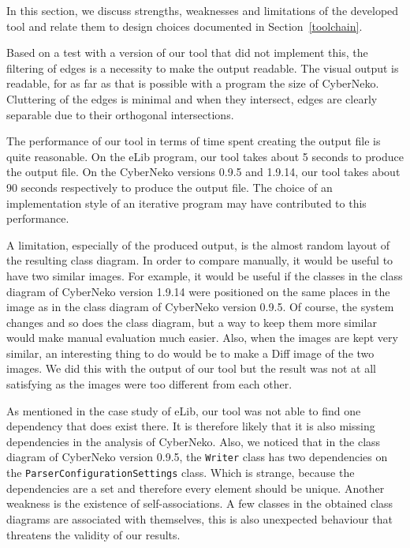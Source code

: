 In this section, we discuss strengths, weaknesses and limitations of the developed tool and relate them to design choices documented in Section~\ref{toolchain}. 

Based on a test with a version of our tool that did not implement this, the filtering of edges is a necessity to make the output readable.
The visual output is readable, for as far as that is possible with a program the size of CyberNeko.
Cluttering of the edges is minimal and when they intersect, edges are clearly separable due to their orthogonal intersections.

The performance of our tool in terms of time spent creating the output file is quite reasonable.
On the eLib program, our tool takes about 5 seconds to produce the output file.
On the CyberNeko versions 0.9.5 and 1.9.14, our tool takes about 90 seconds respectively to produce the output file.
The choice of an implementation style of an iterative program may have contributed to this performance.

A limitation, especially of the produced output, is the almost random layout of the resulting class diagram.
In order to compare manually, it would be useful to have two similar images.
For example, it would be useful if the classes in the class diagram of CyberNeko version 1.9.14 were positioned on the same places in the image as in the class diagram of CyberNeko version 0.9.5. 
Of course, the system changes and so does the class diagram, but a way to keep them more similar would make manual evaluation much easier. 
Also, when the images are kept very similar, an interesting thing to do would be to make a Diff image of the two images.
We did this with the output of our tool but the result was not at all satisfying as the images were too different from each other.

As mentioned in the case study of eLib, our tool was not able to find one dependency that does exist there.
It is therefore likely that it is also missing dependencies in the analysis of CyberNeko.
Also, we noticed that in the class diagram of CyberNeko version 0.9.5, the \texttt{Writer} class has two dependencies on the \texttt{ParserConfigurationSettings} class.
Which is strange, because the dependencies are a set and therefore every element should be unique. 
Another weakness is the existence of self-associations. A few classes in the obtained class diagrams are associated with themselves, this is also unexpected behaviour that threatens the validity of our results.